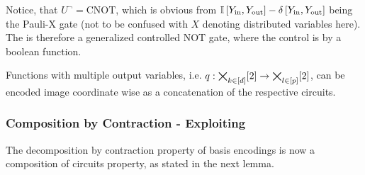 \documentclass[aps,onecolumn,nofootinbib,pra]{article}
\newtheorem{definition}{Definition}
\begin{document}

    Notice, that $U^{\lnot} = \mathrm{CNOT}$, which is obvious from $\mathbb{I}\left[Y_{\mathrm{in}},Y_{\mathrm{out}}\right] - \delta\left[Y_{\mathrm{in}},Y_{\mathrm{out}}\right]$ being the Pauli-X gate (not to be confused with $X$ denoting distributed variables here).
    The \computationCircuit{} is therefore a generalized controlled $\mathrm{NOT}$ gate, where the control is by a boolean function.

    Functions with multiple output variables, i.e. $q:\bigtimes_{k\in[d]}[2]\rightarrow\bigtimes_{l\in[p]}[2]$, can be encoded image coordinate wise as a concatenation of the respective circuits.

    \subsubsection{Composition by Contraction - Exploiting \DecompositionSparsity{}}

    The decomposition by contraction property of basis encodings is now a composition of circuits property, as stated in the next lemma.
\end{document}
